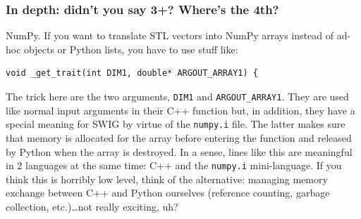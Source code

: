 \documentclass[12pt,a4paper,notitlepage,onecolumn]{article}
\begin{document}
\subsubsection*{In depth: didn't you say 3+? Where's the 4th?}
NumPy. If you want to translate STL vectors into NumPy arrays instead of ad-hoc
objects or Python lists, you have to use stuff like:
\begin{verbatim}
void _get_trait(int DIM1, double* ARGOUT_ARRAY1) {
\end{verbatim}
The trick here are the two arguments, \texttt{DIM1} and \texttt{ARGOUT\_ARRAY1}.
They are used like normal input arguments in their C++ function but, in
addition, they have a special meaning for SWIG by virtue of the \texttt{numpy.i}
file. The latter makes sure that memory is allocated for the array before entering the
function and released by Python when the array is destroyed. In a sense,
lines like this are meaningful in 2 languages at the same time: C++ and the
\texttt{numpy.i} mini-language. If you think
this is horribly low level, think of the alternative: managing memory exchange
between C++ and Python ourselves (reference counting, garbage collection,
etc.)\dots not really exciting, uh?
\end{document}
